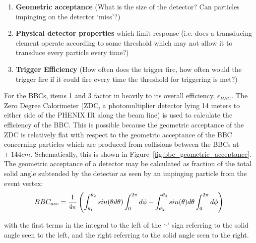 \begin{enumerate}
  \item \textbf{Geometric acceptance} (What is the size of the detector? Can
    particles impinging on the detector `miss'?)
  \item \textbf{Physical detector properties} which limit response (i.e. does a
    transducing element operate according to some threshold which may not allow
    it to transduce every particle every time?)
  \item \textbf{Trigger Efficiency} (How often does the trigger fire, how often
    would the trigger fire if it could fire every time the threshold for
    triggering is met?)
\end{enumerate}

{\noindent}For the BBCs, items 1 and 3 factor in heavily to its overall
efficiency, $\epsilon_{BBC}$. The Zero Degree Calorimeter (ZDC, a
photomultiplier detector lying 14 meters to either side of the PHENIX IR along
the beam line) is used to calculate the efficiency of the BBC. This is possible
because the geometric acceptance of the ZDC is relatively flat with respect to
the geometric acceptance of the BBC concerning particles which are produced
from collisions between the BBCs at $\pm~144cm$.  Schematically, this is shown
in Figure~\ref{fig:bbc_geometric_acceptance}. The geometric acceptance of a
detector may be calculated as fraction of the total solid angle subtended by the
detector as seen by an impinging particle from the event vertex:
\begin{equation}
  BBC_{acc} = {1\over{4\pi}}\left(\int_{\theta_1}^{\theta_2}sin(\theta
    d\theta)\int_{0}^{2\pi}d\phi-\int_{\theta_3}^{\theta_4}sin(\theta)d\theta
    \int_{0}^{2\pi}d\phi\right)
    \label{eq:geometric_acceptance}
\end{equation}

{\noindent}with the first terms in the integral to the left of the `-' sign
referring to the solid angle seen to the left, and the right referring to the
solid angle seen to the right. 


